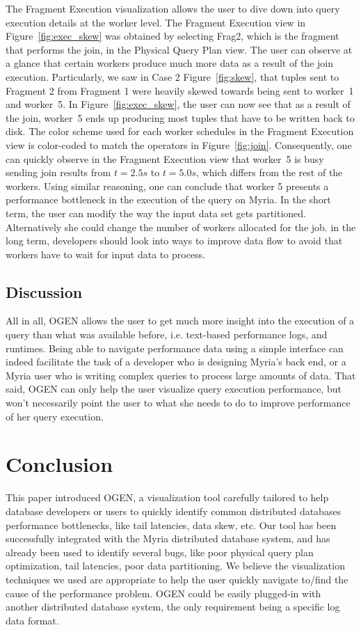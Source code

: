 \documentclass{chi2009}
\newcommand*{\system}{OGEN\xspace}
\newcommand*{\graph}{Physical Query Plan\xspace}
\newcommand*{\fragment}{Fragment Execution\xspace}
\begin{document}
The \fragment visualization allows the user to dive down into query execution details at the worker level. The \fragment view in Figure~\ref{fig:exec_skew} was obtained by selecting Frag2, which is the fragment that performs the join, in the \graph view. The user can observe at a glance that certain workers produce much more data as a result of the join execution. Particularly, we saw in Case 2 Figure~\ref{fig:skew}, that tuples sent to Fragment 2 from Fragment 1 were heavily skewed towards being sent to worker~1 and worker~5. In Figure~\ref{fig:exec_skew}, the user can now see that as a result of the join, worker~5 ends up producing most tuples that have to be written back to disk. The color scheme used for each worker schedules in the \fragment view is color-coded to match the operators in Figure~\ref{fig:join}. Consequently, one can quickly observe in the \fragment view that worker~5 is busy sending join results from $t = 2.5s$ to $t = 5.0s$, which differs from the rest of the workers. Using similar reasoning, one can conclude that worker 5 presents a performance bottleneck in the execution of the query on Myria. In the short term, the user can modify the way the input data set gets partitioned. Alternatively she could change the number of workers allocated for the job. in the long term, developers should look into ways to improve data flow to avoid that workers have to wait for input data to process.

\subsection{Discussion}

All in all, \system allows the user to get much more insight into the execution of a query than what was available before, i.e. text-based performance logs, and runtimes. Being able to navigate performance data using a simple interface can indeed facilitate the task of a developer who is designing Myria's back end, or a Myria user who is writing complex queries to process large amounts of data. That said, \system can only help the user visualize query execution performance, but won't necessarily point the user to what she needs to do to improve performance of her query execution.


\section{Conclusion}


This paper introduced \system, a visualization tool carefully tailored to help
database developers or users to quickly identify common distributed databases
performance bottlenecks, like tail latencies, data skew, etc. Our tool has been
successfully integrated with the Myria distributed database system, and has already
been used to identify several bugs, like poor physical query plan optimization,
tail latencies, poor data partitioning. We believe the visualization techniques
we used are appropriate to help the user quickly navigate to/find the cause of the
performance problem. \system could be easily plugged-in with another
distributed database system, the only requirement being a specific log data
format.
\end{document}
